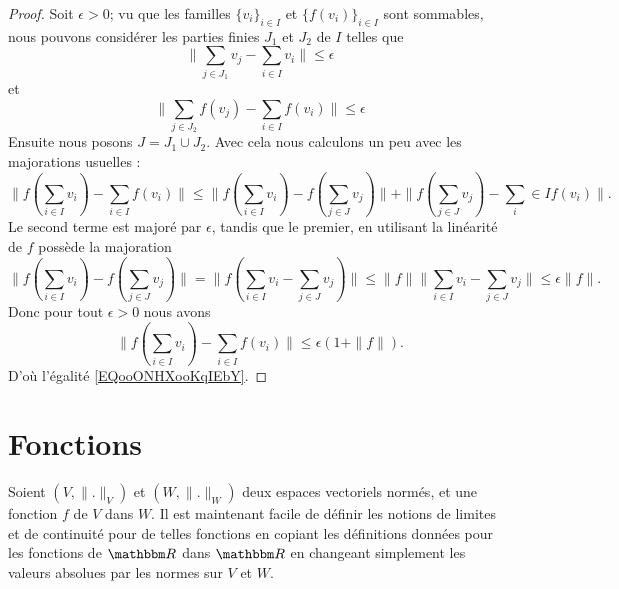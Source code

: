 \begin{proof}
    Soit \( \epsilon>0\); vu que les familles \( \{ v_i \}_{i\in I}\) et \( \{ f(v_i) \}_{i\in I}\) sont sommables, nous pouvons considérer les parties finies \( J_1\) et \( J_2\) de \( I\) telles que
    \begin{equation}
        \big\| \sum_{j\in J_1}v_j-\sum_{i\in I}v_i \big\|\leq \epsilon
    \end{equation}
    et
    \begin{equation}
        \big\| \sum_{j\in J_2}f(v_j)-\sum_{i\in I}f(v_i) \big\|\leq \epsilon
    \end{equation}
    Ensuite nous posons \( J=J_1\cup J_2\). Avec cela nous calculons un peu avec les majorations usuelles :
    \begin{equation}
        \| f(\sum_{i\in I}v_i) -\sum_{i\in I}f(v_i) \|\leq \| f(\sum_{i\in I}v_i)- f(\sum_{j\in J}v_j) \|+  \| f(\sum_{j\in J}v_j)-\sum_i\in If(v_i) \|.
    \end{equation}
    Le second terme est majoré par \( \epsilon\), tandis que le premier, en utilisant la linéarité de \( f\) possède la majoration
    \begin{equation}
        \| f(\sum_{i\in I}v_i)- f(\sum_{j\in J}v_j) \|=\| f(\sum_{i\in I}v_i-\sum_{j\in J}v_j) \|\leq \| f \| \| \sum_{i\in I}v_i- \sum_{j\in J}v_j\|\leq \epsilon\| f \|.
    \end{equation}
    Donc pour tout \( \epsilon>0\) nous avons
    \begin{equation}
        \| f(\sum_{i\in I}v_i) -\sum_{i\in I}f(v_i) \|\leq \epsilon(1+\| f \|).
    \end{equation}
    D'où l'égalité \eqref{EQooONHXooKqIEbY}.
\end{proof}


\section{Fonctions}		\label{Sect_fonctions}

Soient $(V,\| . \|_V)$ et $(W,\| . \|_W)$ deux espaces vectoriels normés, et une fonction $f$ de $V$ dans $W$. Il est maintenant facile de définir les notions de limites et de continuité pour de telles fonctions en copiant les définitions données pour les fonctions de $\eR$ dans $\eR$ en changeant simplement les valeurs absolues par les normes sur $V$ et $W$.

